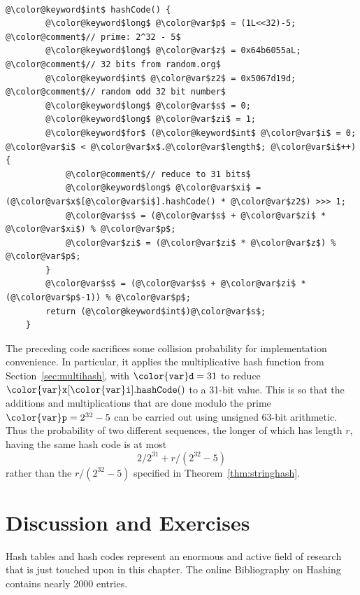 \documentclass[10pt]{book}
\newcommand{\pcodeimport}[1]{}
\newcommand{\secref}[1]{Section~\ref{sec:#1}}
\theoremstyle{plain}
\newcommand{\thmref}[1]{Theorem~\ref{thm:#1}}
\theoremstyle{definition}
\begin{document}
 \ \vspace{.5ex}\begin{Verbatim}[gobble=1,tabsize=2,frame=single,framerule=1.2pt,commandchars=\\@\$,label=\texttt{GeomVector},labelposition=topline]
	@\color@keyword$int$ hashCode() {
		@\color@keyword$long$ @\color@var$p$ = (1L<<32)-5;   @\color@comment$// prime: 2^32 - 5$
		@\color@keyword$long$ @\color@var$z$ = 0x64b6055aL;  @\color@comment$// 32 bits from random.org$
		@\color@keyword$int$ @\color@var$z2$ = 0x5067d19d;   @\color@comment$// random odd 32 bit number$
		@\color@keyword$long$ @\color@var$s$ = 0;
		@\color@keyword$long$ @\color@var$zi$ = 1;
		@\color@keyword$for$ (@\color@keyword$int$ @\color@var$i$ = 0; @\color@var$i$ < @\color@var$x$.@\color@var$length$; @\color@var$i$++) {
			@\color@comment$// reduce to 31 bits$
			@\color@keyword$long$ @\color@var$xi$ = (@\color@var$x$[@\color@var$i$].hashCode() * @\color@var$z2$) >>> 1; 
			@\color@var$s$ = (@\color@var$s$ + @\color@var$zi$ * @\color@var$xi$) % @\color@var$p$;
			@\color@var$zi$ = (@\color@var$zi$ * @\color@var$z$) % @\color@var$p$;	
		}
		@\color@var$s$ = (@\color@var$s$ + @\color@var$zi$ * (@\color@var$p$-1)) % @\color@var$p$;
		return (@\color@keyword$int$)@\color@var$s$;
	}
\end{Verbatim}

\pcodeimport{ods/GeomVector.hashCode()}

The preceding code sacrifices some collision probability for implementation
convenience.  In particular, it applies the multiplicative hash function
from \secref{multihash}, with $\ensuremath{\mathtt{{\color{var}d}}}=31$ to reduce \ensuremath{\mathtt{{\color{var}x}[{\color{var}i}].hashCode()}} to a
31-bit value.  This is so that the additions and multiplications that are
done modulo the prime $\ensuremath{\mathtt{{\color{var}p}}}=2^{32}-5$ can be carried out using unsigned
63-bit arithmetic.  Thus the probability of two different sequences,
the longer of which has length $r$, having the same hash code is at most
\[
    2/2^{31} + r/(2^{32}-5)
\]
rather than the $r/(2^{32}-5)$ specified in \thmref{stringhash}.

\section{Discussion and Exercises}

Hash tables and hash codes represent an enormous and active field
of research that is just touched upon in this chapter.  The online
Bibliography on Hashing \cite{hashing}
%
contains nearly 2000 entries.
\end{document}
